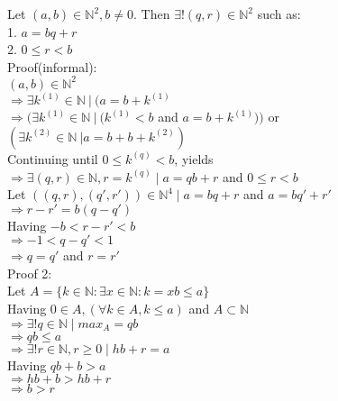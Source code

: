 \documentclass{article}
\begin{document}
\noindent Let $(a,b) \in \mathbb{N}^2, b \neq 0.$
Then $\exists!(q,r) \in \mathbb{N}^2$ such as:\\
1. $ a = bq + r$\\
2. $ 0 \leq r < b$\\

\noindent Proof(informal):\\
$(a,b) \in \mathbb{N}^2$\\
$\Rightarrow \exists k^{(1)} \in \mathbb{N} \ | \ ( a = b + k^{(1)} $\\
$\Rightarrow ( \exists k^{(1)} \in \mathbb{N} \ | \ (k^{(1)} < b$ and $ a = b + k^{(1)})) $ or
$(\exists k^{(2)} \in \mathbb{N} \ |
 a = b + b + k^{(2)})$\\
Continuing until $0 \leq k^{(q)} < b $, yields\\
$\Rightarrow \exists (q,r) \in \mathbb{N}, r = k^{(q)}
\mid a = qb + r$ and $ 0 \leq r < b$\\

\noindent Let $((q,r),(q',r')) \in \mathbb{N}^4 \mid 
a = bq + r $ and $a = bq' + r'$\\
$\Rightarrow r - r' = b(q - q')$\\
Having $ -b <r - r' < b$\\
$\Rightarrow -1 < q-q' <1$\\
$\Rightarrow q = q' $ and $ r = r'$\\

\noindent Proof 2:\\
Let $A = \{k \in \mathbb{N}: \exists x \in \mathbb{N}:
k=xb \leq a\}$\\
Having $0 \in A, (\forall k \in A, k \leq a)$ and $A \subset \mathbb{N}$\\
$\Rightarrow \exists!q \in \mathbb{N} \mid max_A = qb$\\
$\Rightarrow qb \leq a$\\
$\Rightarrow \exists! r  \in \mathbb{N}, r \geq 0 \mid hb +r = a$\\
Having $qb + b > a$\\
$\Rightarrow hb + b > hb +r$\\
$\Rightarrow b > r$
\end{document}
